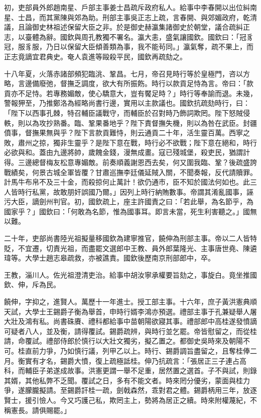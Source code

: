 \begin{pinyinscope}
初，吏部員外郎趙南星、戶部主事姜士昌疏斥政府私人。給事中李春開以出位糾南星、士昌，而其黨陳與郊為助。刑部主事吳正志上疏，言春開、與郊媚政府，乾清議，且論御史林祖述保留大臣之非。於是御史赫瀛集諸御史於朝堂，議合疏糾正志，以臺體為辭。國欽與周孔教獨不署名。瀛大恚，盛氣讓國欽。國欽曰：「冠豸冠，服豸服，乃日以保留大臣傾善類為事，我不能茍同。」瀛氣奪，疏不果上，而正志竟謫宜君典史。奄人袁進等毆殺平民，國欽再疏劾之。

十八年夏，火落赤諸部頻犯臨洮、鞏昌。七月，帝召見時行等於皇極門，咨以方略，言邊備廢弛，督撫乏調度，欲大有所振飭。時行以款貢足恃為言。帝曰：「款貢亦不足恃。若專務媚敵，使心驕意大，豈有饜足時？」時行等奉諭而退。未幾，警報狎至，乃推鄭洛為經略尚書行邊，實用以主款議也。國欽抗疏劾時行，曰：「陛下以西事孔棘，特召輔臣議戰守，而輔臣於召對時乃飾詞欺罔。陛下怒賊侵軼，則以為攻抄熟番。臨、鞏果番地乎？陛下責督撫失機，則以為咎在武臣。封疆僨事，督撫果無與乎？陛下言款貢難恃，則云通貢二十年，活生靈百萬。西寧之敗，肅州之掠，獨非生靈乎？是陛下意在戰，時行必不欲戰；陛下意在絕和，時行必欲與和。蓋由九邊將帥，歲餽金錢，漫無成畫。寇已殘城堡，殺吏民，猶謂計得。三邊總督梅友松意專媚敵。前奏順義謝恩西去矣，何又圍我臨、鞏？後疏盛誇戰績矣，何景古城全軍皆覆？甘肅巡撫李廷儀延賊入關，不聞奏報，反代請贖罪。計馬牛布帛不及三十金，而殺掠何止萬計！欲仍通市，臣不知於國法何如也。此三人皆時行私黨，故敢朋奸誤國乃爾。」因列上時行納賄數事。帝謂其淆亂國事，誣污大臣，謫劍州判官。初，國欽疏上，座主許國責之曰：「若此舉，為名節乎，為國家乎？」國欽曰：「何敢為名節，惟為國事耳。即言未當，死生利害聽之。」國無以難。

二十年，吏部尚書陸光祖擬量移國欽為建寧推官，饒伸為刑部主事。帝以二人皆特貶，不宜遷，切責光祖，而盡罷文選郎中王教、員外郎葉隆光、主事唐世堯、陳遴瑋等。大學士趙志皋疏救，亦被譙責。國欽後歷南京刑部郎中，卒。

王教，淄川人。佐光祖澄清吏治。給事中胡汝寧承權要旨劾之，事旋白。竟坐推國欽、伸，斥為民。

饒伸，字抑之，進賢人。萬歷十一年進士。授工部主事。十六年，庶子黃洪憲典順天試，大學士王錫爵子衡為舉首，申時行婿李鴻亦預選。禮部主事于孔兼疑舉人屠大壯及鴻有私。尚書硃賡、禮科都給事中苗朝陽欲寢其事。禮部郎中高桂遂發憤謫可疑者八人，並及衡，請得覆試。錫爵疏辨，與時行並乞罷。帝皆慰留之，而從桂請，命覆試。禮部侍郎於慎行以大壯文獨劣，擬乙置之。都御史吳時來及朝陽不可。桂直前力爭，乃如慎行議，列甲乙以上。時行、錫爵調旨盡留之，且奪桂俸二月。衡實有才名，錫爵大憤，復上疏極詆桂。伸乃抗疏言：「張居正三子連占高科，而輔臣子弟遂成故事。洪憲更謂一舉不足重，居然置之選首。子不與試，則錄其婿，其他私弊不乏聞。覆試之日，多有不能文者。時來罔分優劣，蒙面與桂力爭，遂朦朧擬請。至錫爵訐桂一疏，劍戟森然，乖對君之體。錫爵柄用三年，放逐賢士，援引憸人。今又巧護己私，欺罔主上，勢將為居正之續。時來附權蔑紀，不稱憲長。請俱賜罷。」


\end{pinyinscope}
